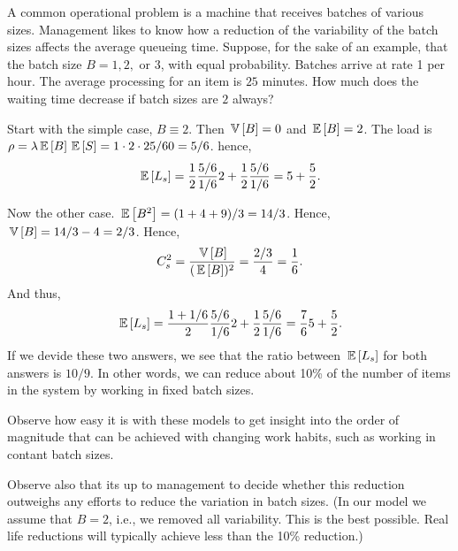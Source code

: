 \begin{question}
  A common operational problem is a machine that receives batches of
  various sizes. Management likes to know how a reduction of the
  variability of the batch sizes affects the average queueing time.
  Suppose, for the sake of an example, that the batch size $B=1,2,$ or
  $3$, with equal probability. Batches arrive at rate 1 per hour. The
  average processing for an item is $25$ minutes.  How much does the
  waiting time decrease if batch sizes are $2$ always?

  \begin{solution}
    Start with the simple case, $B\equiv 2$. Then $\,\mathbb{V}\left[B\right]=0$ and
    $\,\mathbb{E}\left[B\right] = 2$. The load is $\rho=\lambda \,\mathbb{E}\left[B\right] \,\mathbb{E}\left[S\right] = 1\cdot 2 \cdot 25/60 = 5/6$.  hence,
    \begin{equation*}
      \,\mathbb{E}\left[L_s\right] = \frac 12 \frac{5/6}{1/6} 2 + \frac 12 \frac{5/6}{1/6} = 5 + \frac52.
    \end{equation*}

Now the other case. $\,\mathbb{E}\left[B^2\right] = (1+4+9)/3 = 14/3$. Hence, $\,\mathbb{V}\left[B\right]=14/3 - 4=2/3$. Hence, 
\begin{equation*}
C_s^2=\frac{\,\mathbb{V}\left[B\right]}{(\,\mathbb{E}\left[B\right])^2} = \frac{2/3}4 = \frac 16.
\end{equation*}
And thus, 
    \begin{equation*}
      \,\mathbb{E}\left[L_s\right] = \frac {1+1/6}2 \frac{5/6}{1/6} 2 + \frac 12 \frac{5/6}{1/6} = \frac76 5 + \frac 52.
    \end{equation*}
    If we devide these two answers, we see that the ratio between
    $\,\mathbb{E}\left[L_s\right]$ for both answers is $10/9$. In other words, we can
    reduce about 10\% of the number of items in the system by working
    in fixed batch sizes. 

    Observe how easy it is with these models to get insight into the
    order of magnitude that can be achieved with changing work habits,
    such as working in contant batch sizes. 

    Observe also that its up to management to decide whether this
    reduction outweighs any efforts to reduce the variation in batch
    sizes. (In our model we assume that $B=2$, i.e., we removed all
    variability. This is the best possible. Real life reductions will
    typically achieve less than the 10\% reduction.)
  \end{solution}
\end{question}

